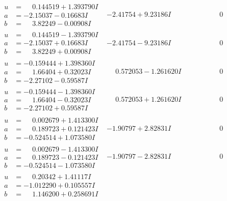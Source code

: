 \documentclass[1p]{elsarticle_modified}
\theoremstyle{definition}
\begin{document}
$$\begin{array}{c|c|c}
\begin{aligned}
u &= \phantom{-}0.144519 + 1.393790 I \\
a &= -2.15037 - 0.16683 I \\
b &= \phantom{-}3.82249 - 0.00908 I\end{aligned}
 & -2.41754 + 9.23186 I & \phantom{-0.000000 } 0 \\ \hline\begin{aligned}
u &= \phantom{-}0.144519 - 1.393790 I \\
a &= -2.15037 + 0.16683 I \\
b &= \phantom{-}3.82249 + 0.00908 I\end{aligned}
 & -2.41754 - 9.23186 I & \phantom{-0.000000 } 0 \\ \hline\begin{aligned}
u &= -0.159444 + 1.398360 I \\
a &= \phantom{-}1.66404 + 0.32023 I \\
b &= -2.27102 - 0.59587 I\end{aligned}
 & \phantom{-}0.572053 - 1.261620 I & \phantom{-0.000000 } 0 \\ \hline\begin{aligned}
u &= -0.159444 - 1.398360 I \\
a &= \phantom{-}1.66404 - 0.32023 I \\
b &= -2.27102 + 0.59587 I\end{aligned}
 & \phantom{-}0.572053 + 1.261620 I & \phantom{-0.000000 } 0 \\ \hline\begin{aligned}
u &= \phantom{-}0.002679 + 1.413300 I \\
a &= \phantom{-}0.189723 + 0.121423 I \\
b &= -0.524514 + 1.073580 I\end{aligned}
 & -1.90797 + 2.82831 I & \phantom{-0.000000 } 0 \\ \hline\begin{aligned}
u &= \phantom{-}0.002679 - 1.413300 I \\
a &= \phantom{-}0.189723 - 0.121423 I \\
b &= -0.524514 - 1.073580 I\end{aligned}
 & -1.90797 - 2.82831 I & \phantom{-0.000000 } 0 \\ \hline\begin{aligned}
u &= \phantom{-}0.20342 + 1.41117 I \\
a &= -1.012290 + 0.105557 I \\
b &= \phantom{-}1.146200 + 0.258691 I\end{aligned}

\end{array}$$
\end{document}
